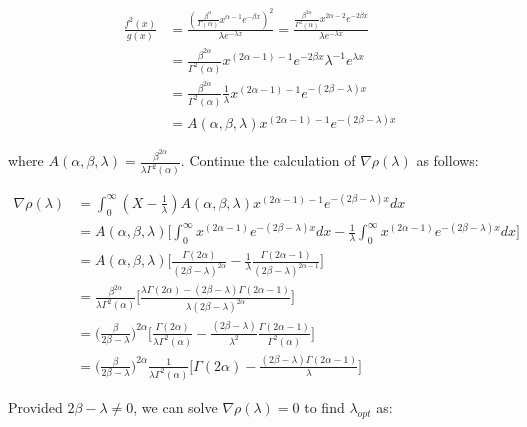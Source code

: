 \documentclass{article}
\begin{document}
\begin{align*}
\frac{f^{2}(x)}{g(x)} &= \frac{ \left( \frac{\beta^\alpha}{\Gamma(\alpha)} x^{\alpha - 1} e^{-\beta x} \right)^2 }{\lambda e^{-\lambda x}} = \frac{ \frac{ \beta^{2 \alpha} }{ \Gamma^{2}(\alpha) }x^{2\alpha-2} e^{-2 \beta x} }{\lambda e^{-\lambda x}} \\
&= \frac{\beta^{2 \alpha}}{\Gamma^{2}(\alpha)} x^{(2 \alpha - 1)-1} e^{-2 \beta x} \lambda^{-1} e^{\lambda x} \\
&= \frac{\beta^{2 \alpha}}{\Gamma^{2}(\alpha)} \frac{1}{\lambda} x^{(2 \alpha - 1)-1} e^{-(2 \beta - \lambda) x} \\
&= A(\alpha,\beta,\lambda) x^{(2 \alpha - 1) - 1} e^{-(2 \beta - \lambda)x}
\end{align*}

where $A(\alpha,\beta,\lambda) = \frac{\beta^{2 \alpha}}{\lambda \Gamma^{2}(\alpha)}$. Continue the calculation of $\nabla \rho(\lambda)$ as follows:

\begin{align*}
\nabla \rho(\lambda) &= \int_{0}^{\infty} (X - \frac{1}{\lambda}) A(\alpha,\beta,\lambda) x^{(2 \alpha - 1) - 1} e^{-(2 \beta - \lambda)x} dx \\
&= A(\alpha,\beta,\lambda) \Bigg[ \int_{0}^{\infty} x^{(2 \alpha - 1)} e^{-(2 \beta - \lambda)x} dx - \frac{1}{\lambda} \int_{0}^{\infty} x^{(2 \alpha - 1)} e^{-(2 \beta - \lambda) x} dx \Bigg] \\
&= A(\alpha,\beta,\lambda) \Bigg[ \frac{\Gamma(2 \alpha)}{ (2 \beta - \lambda)^{2 \alpha} } - \frac{1}{\lambda} \frac{\Gamma(2 \alpha - 1)}{(2 \beta - \lambda)^{2 \alpha - 1}} \Bigg] \\
&= \frac{\beta^{2 \alpha}}{\lambda \Gamma^{2}(\alpha)} \Bigg[ \frac{\lambda \Gamma(2 \alpha) - (2 \beta - \lambda) \Gamma(2 \alpha - 1)}{ \lambda (2 \beta - \lambda)^{2 \alpha} } \Bigg] \\
&= \Bigg( \frac{\beta}{ 2 \beta - \lambda} \Bigg)^{2 \alpha} \Bigg[ \frac{\Gamma(2 \alpha)}{\lambda \Gamma^{2}(\alpha)} - \frac{(2 \beta - \lambda)}{\lambda^2} \frac{\Gamma(2 \alpha - 1)}{\Gamma^{2}(\alpha)} \Bigg] \\
&= \Bigg( \frac{\beta}{ 2 \beta - \lambda} \Bigg)^{2 \alpha} \frac{1}{\lambda \Gamma^{2}(\alpha)} \Bigg[ \Gamma(2 \alpha) - \frac{(2\beta-\lambda)\Gamma(2\alpha-1)}{\lambda} \Bigg]
\end{align*}

Provided $2 \beta - \lambda \neq 0$, we can solve $\nabla \rho(\lambda) = 0$ to find $\lambda_{opt}$ as:
\end{document}
